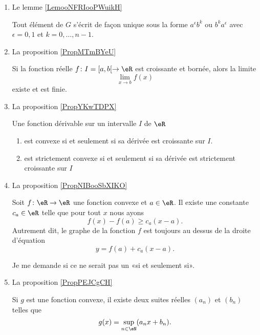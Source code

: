 \begin{enumerate}
\item Le lemme \ref{LemooNFRIooPWuikH}
\begin{lemma}
    Tout élément de \( G\) s'écrit de façon unique sous la forme \( a^{\epsilon}b^k\) ou \( b^ka^{\epsilon}\) avec \( \epsilon=0,1\) et \( k=0,\ldots, n-1\).
\end{lemma}

\item La proposition \ref{PropMTmBYeU}


\begin{proposition}
    Si la fonction réelle \( f\colon I=\mathopen[ a , b [\to \eR\) est croissante et bornée, alors la limite
    \begin{equation}
        \lim_{x\to b} f(x)
    \end{equation}
    existe et est finie.
\end{proposition}

\item La proposition \ref{PropYKwTDPX}

\begin{proposition}
    Une fonction dérivable sur un intervalle \( I\) de \( \eR\) 
    \begin{enumerate}
        \item
            est convexe si et seulement si sa dérivée est croissante sur \( I\).
        \item
            est strictement convexe si et seulement si sa dérivée est strictement croissante sur \( I\)
    \end{enumerate}
\end{proposition}

\item La proposition \ref{PropNIBooSbXIKO}

\begin{proposition}
    Soit \( f\colon \eR\to \eR \) une fonction convexe et \( a\in \eR\). Il existe une constante \( c_a\in \eR\) telle que pour tout \( x\) nous ayons
    \begin{equation}
        f(x)-f(a)\geq c_a(x-a).
    \end{equation}
    Autrement dit, le graphe de la fonction \( f\) est toujours au dessus de la droite d'équation
    \begin{equation}
        y=f(a)+c_a(x-a).
    \end{equation}
\end{proposition}

Je me demande si ce ne serait pas un «si et seulement si».
\item La proposition \ref{PropPEJCgCH}
\begin{proposition}
    Si \( g\) est une fonction convexe, il existe deux suites réelles \( (a_n)\) et \( (b_n)\) telles que
    \begin{equation}
        g(x)=\sup_{n\in \eN}(a_nx+b_n).
    \end{equation}
\end{proposition}


\end{enumerate}
